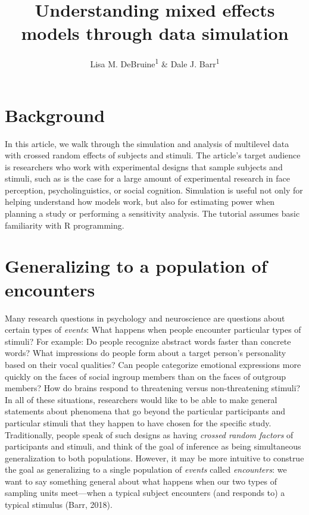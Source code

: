 \documentclass[english,doc,floatsintext]{apa6}
\title{Understanding mixed effects models through data simulation}
\author{Lisa M. DeBruine\textsuperscript{1} \& Dale J. Barr\textsuperscript{1}}
\date{}
\affiliation{\vspace{0.5cm}\textsuperscript{1} Institute of Neuroscience and Psychology, University of Glasgow}
\begin{document}
\maketitle

\hypertarget{background}{%
\section{Background}\label{background}}

In this article, we walk through the simulation and analysis of multilevel data with crossed random effects of subjects and stimuli. The article's target audience is researchers who work with experimental designs that sample subjects and stimuli, such as is the case for a large amount of experimental research in face perception, psycholinguistics, or social cognition. Simulation is useful not only for helping understand how models work, but also for estimating power when planning a study or performing a sensitivity analysis. The tutorial assumes basic familiarity with R programming.

\hypertarget{generalizing-to-a-population-of-encounters}{%
\section{Generalizing to a population of encounters}\label{generalizing-to-a-population-of-encounters}}

Many research questions in psychology and neuroscience are questions about certain types of \emph{events}: What happens when people encounter particular types of stimuli? For example: Do people recognize abstract words faster than concrete words? What impressions do people form about a target person's personality based on their vocal qualities? Can people categorize emotional expressions more quickly on the faces of social ingroup members than on the faces of outgroup members? How do brains respond to threatening versus non-threatening stimuli? In all of these situations, researchers would like to be able to make general statements about phenomena that go beyond the particular participants and particular stimuli that they happen to have chosen for the specific study. Traditionally, people speak of such designs as having \emph{crossed random factors} of participants and stimuli, and think of the goal of inference as being simultaneous generalization to both populations. However, it may be more intuitive to construe the goal as generalizing to a single population of \emph{events} called \emph{encounters}: we want to say something general about what happens when our two types of sampling units meet---when a typical subject encounters (and responds to) a typical stimulus (Barr, 2018).
\end{document}
